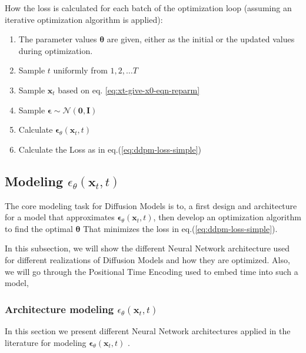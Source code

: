 \documentclass[11pt]{article}
\begin{document}
    How the loss is calculated for each batch of the optimization loop (assuming an iterative optimization algorithm is applied):
    \begin{enumerate}
        \item The parameter values $\bm{\theta}$ are given, either as the initial or the updated values during optimization.
        \item Sample $t$ uniformly from $1,2,\dots T$
        \item Sample $\mathbf{x}_t$ based on eq. \ref{eq:xt-give-x0-eqn-reparm}
        \item Sample $\bm{\epsilon} \sim \mathcal{N}(\mathbf{0},\mathbf{I})$
        \item Calculate $\bm{\epsilon}_{\theta}(\mathbf{x}_t,t)$
        \item Calculate the Loss as in eq.(\ref{eq:ddpm-loss-simple})
    \end{enumerate}


    \subsection{Modeling $\epsilon_{\theta}(\mathbf{x}_t,t)$}\label{subsec:modeling-ddpm-prametric-noise}
    The core modeling task for Diffusion Models is to, a first design and architecture for a model that approximates
    $\bm{\epsilon}_{\theta}(\mathbf{x}_t,t)$, then develop an optimization algorithm to find the optimal $\bm{\theta}$
    That minimizes the loss in eq.(\ref{eq:ddpm-loss-simple}).

    In this subsection, we will show the different
    Neural Network architecture used for different realizations of Diffusion Models and how they are optimized.
    Also, we will go through the Positional Time Encoding used to embed time into such a model,

    \subsubsection{Architecture modeling $\epsilon_{\theta}(\mathbf{x}_t,t)$}
    In this section we present different Neural Network architectures applied in the literature for modeling
    $\bm{\epsilon}_{\theta}(\mathbf{x}_t,t)$ \cite{Diffusio93:online,ho2020denoising,WhatareD38:online}.

\end{document}
